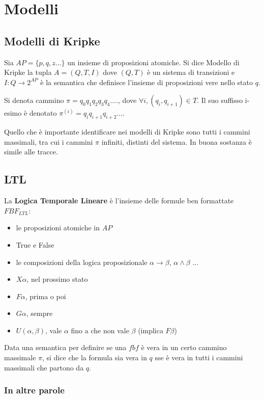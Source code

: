 \chapter{Modelli}

\section{Modelli di Kripke}

Sia $AP = \{p, q, z ... \}$ un insieme di proposizioni atomiche. Si dice Modello di Kripke la tupla $A = (Q, T, I)$ dove $(Q, T)$ \`e un sistema di transizioni e $I : Q \rightarrow 2^{AP}$ \`e la semantica che definisce l'insieme di proposizioni vere nello stato $q$.

Si denota cammino $\pi = q_0q_1q_2q_3q_4....$, dove $\forall i, (q_i, q_{i+1}) \in T$.
Il suo suffisso i-esimo \`e denotato $\pi^{(i)} = q_{i}q_{i+1}q_{i+2}...$.

Quello che \`e importante identificare nei modelli di Kripke sono tutti i cammini massimali, tra cui i cammini $\pi$ infiniti, distinti del sistema. In buona sostanza \`e simile alle tracce.

\section{LTL}

La \textbf{Logica Temporale Lineare} \`e l'insieme delle formule ben formattate $FBF_{LTL}$:
\begin{itemize}
    \item le proposizioni atomiche in $AP$
    \item True e False
    \item le composizioni della logica proposizionale $\alpha \rightarrow \beta$, $\alpha \land \beta$ ...
    \item $X\alpha$, nel prossimo stato
    \item $F\alpha$, prima o poi
    \item $G\alpha$, sempre
    \item $U(\alpha, \beta)$, vale $\alpha$ fino a che non vale $\beta$ (implica $F\beta$)
\end{itemize}

Data una semantica per definire se una $fbf$ \`e vera in un certo cammino massimale $\pi$, si dice che la formula sia vera in $q$ sse \`e vera in tutti i cammini massimali che partono da $q$.

\subsection{In altre parole}

